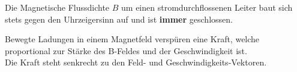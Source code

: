 	\beginip
	Die Magnetische Flussdichte $B$ um einen stromdurchflossenen Leiter baut sich stets gegen den Uhrzeigersinn auf und ist \textbf{immer} geschlossen. \\
	\begin{center}
	\end{center}
	\iend

	\begingl
	Bewegte Ladungen in einem Magnetfeld verspüren eine Kraft, welche proportional zur Stärke des B-Feldes und der Geschwindigkeit ist. \\
	Die Kraft steht senkrecht zu den Feld- und Geschwindigkeits-Vektoren.


	\begin{center}
	\end{center}

